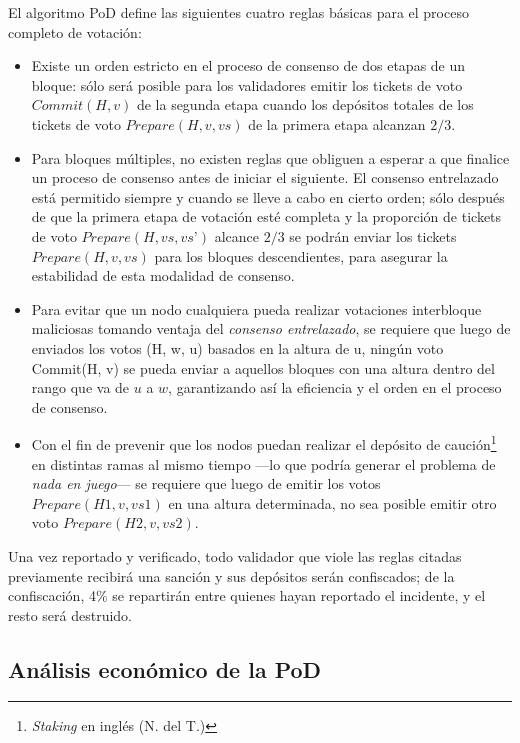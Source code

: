El algoritmo PoD define las siguientes cuatro reglas básicas para el proceso completo de votación:

\begin{itemize}
\item Existe un orden estricto en el proceso de consenso de dos etapas de un bloque: sólo será posible para los validadores emitir los tickets de voto $Commit(H, v)$ de la segunda etapa cuando los depósitos totales de los tickets de voto $Prepare(H, v, vs)$ de la primera etapa alcanzan $2/3$.

\item Para bloques múltiples, no existen reglas que obliguen a esperar a que finalice un proceso de consenso antes de iniciar el siguiente. El consenso entrelazado está permitido siempre y cuando se lleve a cabo en cierto orden; sólo después de que la primera etapa de votación esté completa y la proporción de tickets de voto $Prepare(H, vs, vs’)$ alcance $2/3$ se podrán enviar los tickets $Prepare(H, v, vs)$ para los bloques descendientes, para asegurar la estabilidad de esta modalidad de consenso.

\item Para evitar que un nodo cualquiera pueda realizar votaciones interbloque maliciosas tomando ventaja del \textit{consenso entrelazado}, se requiere que luego de enviados los votos (H, w, u) basados en la altura de u, ningún voto Commit(H, v) se pueda enviar a aquellos bloques con una altura dentro del rango que va de $u$ a $w$, garantizando así la eficiencia y el orden en el proceso de consenso.

\item Con el fin de prevenir que los nodos puedan realizar el depósito de caución\footnote{\textit{Staking} en inglés (N. del T.)} en distintas ramas al mismo tiempo —lo que podría generar el problema de \textit{nada en juego}— se requiere que luego de emitir los votos $Prepare(H1, v, vs1)$ en una altura determinada, no sea posible emitir otro voto $Prepare(H2, v, vs2)$.
\end{itemize}

Una vez reportado y verificado, todo validador que viole las reglas citadas previamente recibirá una sanción y sus depósitos serán confiscados; de la confiscación, 4\% se repartirán entre quienes hayan reportado el incidente, y el resto será destruido.

\subsection{Análisis económico de la PoD}
\label{pod:economic}

